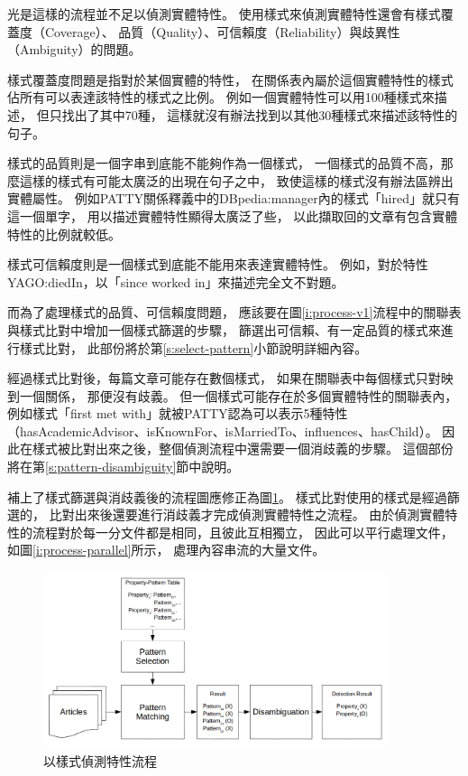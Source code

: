

光是這樣的流程並不足以偵測實體特性。
使用樣式來偵測實體特性還會有樣式覆蓋度（Coverage）、
品質（Quality）、可信賴度（Reliability）與歧異性（Ambiguity）的問題。

樣式覆蓋度問題是指對於某個實體的特性，
在關係表內屬於這個實體特性的樣式佔所有可以表達該特性的樣式之比例。
例如一個實體特性可以用100種樣式來描述，
但只找出了其中70種，
這樣就沒有辦法找到以其他30種樣式來描述該特性的句子。

樣式的品質則是一個字串到底能不能夠作為一個樣式，    %
一個樣式的品質不高，那麼這樣的樣式有可能太廣泛的出現在句子之中，
致使這樣的樣式沒有辦法區辨出實體屬性。
例如PATTY關係釋義中的DBpedia:manager內的樣式「hired」就只有這一個單字，
用以描述實體特性顯得太廣泛了些，
以此擷取回的文章有包含實體特性的比例就較低。

樣式可信賴度則是一個樣式到底能不能用來表達實體特性。
例如，對於特性YAGO:diedIn，以「since worked in」來描述完全文不對題。

而為了處理樣式的品質、可信賴度問題，
應該要在圖\ref{i:process-v1}流程中的關聯表與樣式比對中增加一個樣式篩選的步驟，
篩選出可信賴、有一定品質的樣式來進行樣式比對，
此部份將於第\ref{s:select-pattern}小節說明詳細內容。

經過樣式比對後，每篇文章可能存在數個樣式，
如果在關聯表中每個樣式只對映到一個關係，
那便沒有歧義。
但一個樣式可能存在於多個實體特性的關聯表內，
例如樣式「first met with」就被PATTY認為可以表示5種特性（hasAcademicAdvisor、isKnownFor、isMarriedTo、influences、hasChild）。
因此在樣式被比對出來之後，整個偵測流程中還需要一個消歧義的步驟。
這個部份將在第\ref{s:pattern-disambiguity}節中說明。

補上了樣式篩選與消歧義後的流程圖應修正為圖\ref{i:process-v2}。
樣式比對使用的樣式是經過篩選的，
比對出來後還要進行消歧義才完成偵測實體特性之流程。
由於偵測實體特性的流程對於每一分文件都是相同，且彼此互相獨立，
因此可以平行處理文件，如圖\ref{i:process-parallel}所示，
處理內容串流的大量文件。

\begin{figure}
    \centering
    \includegraphics[width=0.9\textwidth]{images/03-process-v2}
    \caption{以樣式偵測特性流程}
    \label{i:process-v2}
\end{figure}

